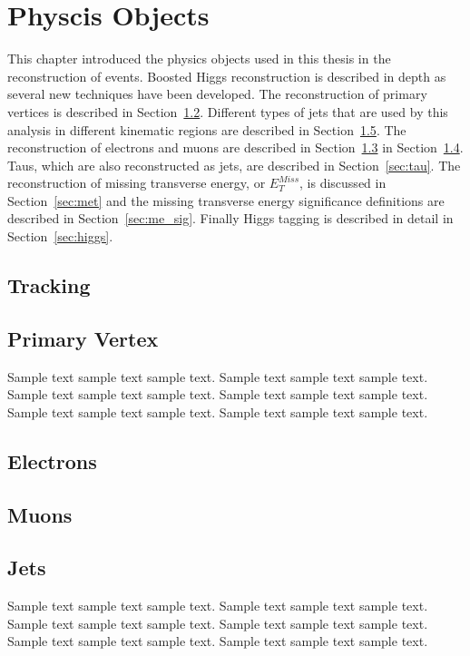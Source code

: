 \chapter{Physcis Objects}

\label{ch:objects}
This chapter introduced the physics objects used in this thesis in the reconstruction of events. 
Boosted Higgs reconstruction is described in depth as several new techniques have been developed.
 The reconstruction of primary vertices is described in Section~\ref{sec:pv}. 
Different types of jets that are used by this analysis in different kinematic regions are described in Section~\ref{sec:jets}. 
The reconstruction of electrons and muons are described in Section~\ref{sec:el} in Section~\ref{sec:mu}. 
Taus, which are also reconstructed as jets, are described in Section~\ref{sec:tau}. 
The reconstruction of missing transverse energy, or $E_T^{Miss}$, is discussed in Section~\ref{sec:met} 
and the missing transverse energy significance definitions are described in Section~\ref{sec:me_sig}. 
Finally Higgs tagging is described in detail in Section~\ref{sec:higgs}. 

\section{Tracking}

\section{Primary Vertex}
\label{sec:pv}
Sample text sample text sample text. Sample text sample text sample text.
Sample text sample text sample text. Sample text sample text sample text.
Sample text sample text sample text. Sample text sample text sample text.

\section{Electrons}
\label{sec:el}
\section{Muons}
\label{sec:mu}
\section{Jets}
\label{sec:jets}
Sample text sample text sample text. Sample text sample text sample text.
Sample text sample text sample text. Sample text sample text sample text.
Sample text sample text sample text. Sample text sample text sample text.
